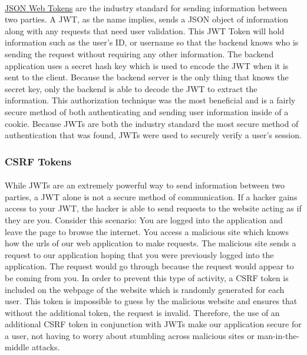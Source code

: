 \documentclass[12pt]{article}
\begin{document}
	\paragraph{}
		\href{https://jwt.io/introduction/}{JSON Web Tokens} are the industry standard for sending information between two parties. A JWT, as the name implies, sends  a JSON object of information along with any requests that need user validation. This JWT Token will hold information such as the user's ID, or username so that the backend knows who is sending the request without requiring any other information. The backend application uses a secret hash key which is used to encode the JWT when it is sent to the client. Because the backend server is the only thing that knows the secret key, only the backend is able to decode the JWT to extract the information. This authorization technique was the most beneficial and is a fairly secure method of both authenticating and sending user information inside of a cookie. Because JWTs are both the industry standard the most secure method of authentication that was found, JWTs were used to securely verify a user's session.
	
	\subsubsection{CSRF Tokens}
	\paragraph{}
		While JWTs are an extremely powerful way to send information between two parties, a JWT alone is not a secure method of communication. If a hacker gains access to your JWT, the hacker is able to send requests to the website acting as if they are you. Consider this scenario: You are logged into the application and leave the page to browse the internet. You access a malicious site which knows how the urls of our web application to make requests. The malicious site sends a request to our application hoping that you were previously logged into the application. The request would go through because the request would appear to be coming from you. In order to prevent this type of activity, a CSRF token is included on the webpage of the website which is randomly generated for each user. This token is impossible to guess by the malicious website and ensures that without the additional token, the request is invalid. Therefore, the use of an additional CSRF token in conjunction with JWTs make our application secure for a user, not having to worry about stumbling across malicious sites or man-in-the-middle attacks.
\end{document}
